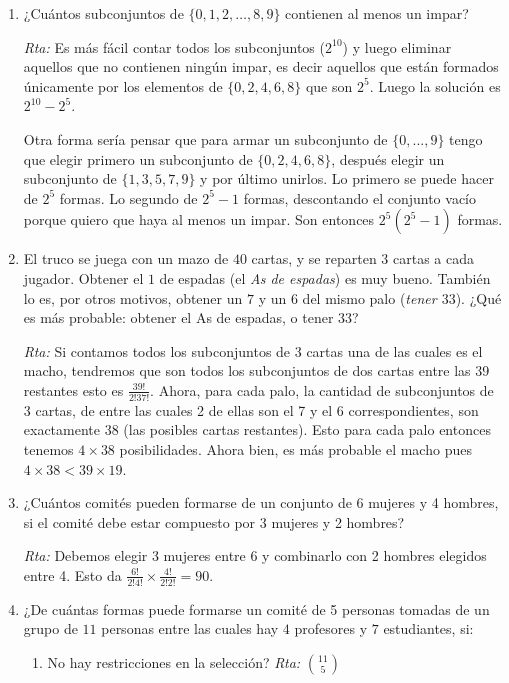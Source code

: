 \begin{enumerate}
    \item ¿Cuántos subconjuntos de $\{0,1,2,\dots,8,9\}$ contienen al menos un impar?
    
    \noindent\textit{Rta:} Es más fácil contar todos los subconjuntos ($2^{10}$) y luego eliminar aquellos que no contienen ningún impar, es decir aquellos que están formados únicamente por los elementos de $\{0,2,4,6,8\}$ que son $2^5$. Luego la solución es $2^{10}-2^5$.
    
    Otra forma sería pensar que para armar un subconjunto de $\{0,...,9\}$ tengo que elegir primero un subconjunto de $\{0,2,4,6,8\}$, después elegir un subconjunto de $\{1,3,5,7,9\}$ y por último unirlos. Lo primero se puede hacer de $2^5$ formas. Lo segundo de $2^5-1$ formas, descontando el conjunto vacío porque quiero que haya al menos un impar. Son entonces $2^5 (2^5 - 1)$ formas.
    
    
    
    \item El truco se juega con un mazo de $40$ cartas, y se reparten $3$ cartas a cada jugador. Obtener el $1$ de espadas (el \textit{As de espadas}) es muy bueno. También lo es, por otros motivos, obtener un $7$ y un $6$ del mismo palo (\textit{tener $33$}). ¿Qué es más probable: obtener el As de espadas, o tener $33$?
    
    \noindent\textit{Rta:} Si contamos todos los subconjuntos de 3 cartas una de las cuales es el macho, tendremos que son todos los subconjuntos de dos cartas entre las 39 restantes esto es $\frac{39!}{2!37!}$.
    Ahora, para cada palo, la cantidad de subconjuntos de 3 cartas, de entre las cuales 2 de ellas son el 7 y el 6 correspondientes, son exactamente 38 (las posibles cartas restantes). Esto para cada palo entonces tenemos $4\times 38$ posibilidades. Ahora bien, es más probable el macho pues $4\times 38< 39\times 19$. 
    
    
    
    \item ¿Cuántos comités pueden formarse de un conjunto de 6 mujeres y 4 hombres, si el comité debe estar compuesto por 3 mujeres y 2 hombres?
    
    \noindent\textit{Rta:} Debemos elegir 3 mujeres entre 6 y combinarlo con 2 hombres elegidos entre 4. Esto da $\frac{6!}{2!4!}\times \frac{4!}{2!2!}=90$.
    
    
    
    \item ¿De cuántas formas puede formarse un comité de 5 personas tomadas de un grupo de $11$ personas entre las cuales hay $4$ profesores y $7$ estudiantes, si:
    \begin{enumerate}
    \item 
    No hay restricciones en la selección?
    \noindent\textit{Rta:}  $\binom{11}{5}$
    

\end{enumerate}
\end{enumerate}

